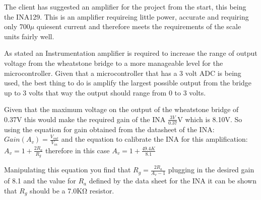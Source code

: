 
The client has suggested an amplifier for the project from the start, this being the INA129. This is an amplifier requireing little power, accurate and requiring only 700\(\mu\) quiesent current and therefore meets the requirements of the scale units fairly well.

As stated an Instrumentation amplifier is required to increase the range of output voltage from the wheatstone bridge to a more manageable level for the microcontroller. Given that a microcontroller that has a 3 volt ADC is being used, the best thing to do is amplify the largest possible output from the bridge up to 3 volts that way the output should range from 0 to 3 volts. 

Given that the maximum voltage on the output of the wheatstone bridge of 0.37V this would make the required gain of the INA \(\frac{3V}{0.37}\)V which is 8.10V. So using the equation for gain obtained from the datasheet of the INA: \(Gain(A_{v}) = \frac{V_{out}}{V_{in}}\) and the equation to calibrate the INA for this amplification: 
$A_v = 1 + \frac{2R_a}{R_g}$ therefore in this case $A_v = 1 + \frac{49.4K}{8.1}$

Manipulating this equation you find that $R_g = \frac{2R_a}{A_v - 1}$ plugging in the desired gain of 8.1 and the value for $R_a$ defined by the data sheet for the INA it can be shown that $R_g$ should be a 7.0KΩ resistor. 